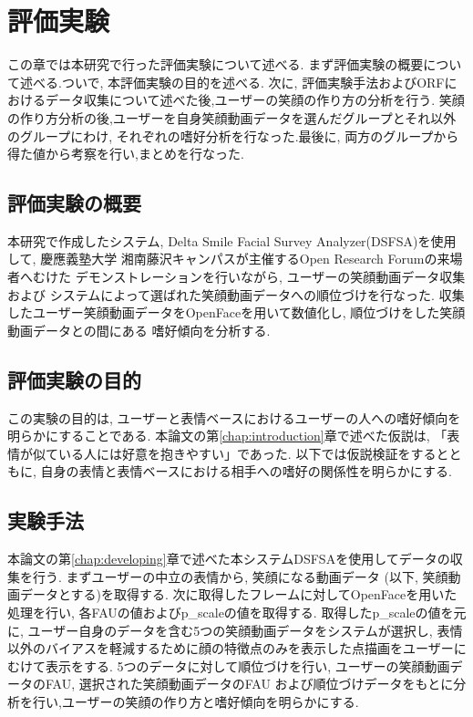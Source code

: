 \chapter{評価実験}
\label{chap:main_experiment}

この章では本研究で行った評価実験について述べる.
まず評価実験の概要について述べる.ついで, 本評価実験の目的を述べる.
次に, 評価実験手法およびORFにおけるデータ収集について述べた後,ユーザーの笑顔の作り方の分析を行う.
笑顔の作り方分析の後,ユーザーを自身笑顔動画データを選んだグループとそれ以外のグループにわけ,
それぞれの嗜好分析を行なった.最後に, 両方のグループから得た値から考察を行い,まとめを行なった.


\section{評価実験の概要}
本研究で作成したシステム, Delta Smile Facial Survey Analyzer(DSFSA)を使用して,
慶應義塾大学 湘南藤沢キャンパスが主催するOpen Research Forumの来場者へむけた
デモンストレーションを行いながら, ユーザーの笑顔動画データ収集および
システムによって選ばれた笑顔動画データへの順位づけを行なった.
収集したユーザー笑顔動画データをOpenFaceを用いて数値化し, 順位づけをした笑顔動画データとの間にある
嗜好傾向を分析する.

\section{評価実験の目的}
この実験の目的は, ユーザーと表情ベースにおけるユーザーの人への嗜好傾向を明らかにすることである.
本論文の第\ref{chap:introduction}章で述べた仮説は, 「表情が似ている人には好意を抱きやすい」であった.
以下では仮説検証をするとともに, 自身の表情と表情ベースにおける相手への嗜好の関係性を明らかにする.

\section{実験手法}
本論文の第\ref{chap:developing}章で述べた本システムDSFSAを使用してデータの収集を行う.
まずユーザーの中立の表情から, 笑顔になる動画データ (以下, 笑顔動画データとする)を取得する.
次に取得したフレームに対してOpenFaceを用いた処理を行い, 各FAUの値およびp\_scaleの値を取得する.
取得したp\_scaleの値を元に, ユーザー自身のデータを含む5つの笑顔動画データをシステムが選択し,
表情以外のバイアスを軽減するために顔の特徴点のみを表示した点描画をユーザーにむけて表示をする.
5つのデータに対して順位づけを行い, ユーザーの笑顔動画データのFAU, 選択された笑顔動画データのFAU
および順位づけデータをもとに分析を行い,ユーザーの笑顔の作り方と嗜好傾向を明らかにする.

